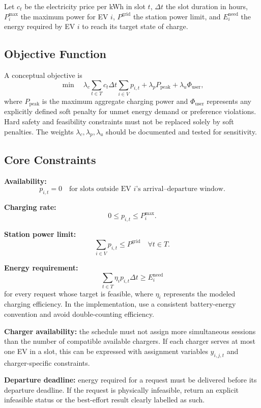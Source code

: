 \documentclass[11pt,a4paper]{article}
\begin{document}
Let \(c_t\) be the electricity price per kWh in slot \(t\), \(\Delta t\) the slot duration in hours, \(P_i^{\max}\) the maximum power for EV \(i\), \(P^{\mathrm{grid}}\) the station power limit, and \(E_i^{\mathrm{need}}\) the energy required by EV \(i\) to reach its target state of charge.

\subsection{Objective Function}

A conceptual objective is
\[
\min \quad
\lambda_c \sum_{t\in T} c_t \Delta t \sum_{i\in V} p_{i,t}
+ \lambda_p P_{\mathrm{peak}}
+ \lambda_u \Phi_{\mathrm{user}},
\]
where \(P_{\mathrm{peak}}\) is the maximum aggregate charging power and \(\Phi_{\mathrm{user}}\) represents any explicitly defined soft penalty for unmet energy demand or preference violations. Hard safety and feasibility constraints must not be replaced solely by soft penalties. The weights \(\lambda_c,\lambda_p,\lambda_u\) should be documented and tested for sensitivity.

\subsection{Core Constraints}

\textbf{Availability:}
\[
p_{i,t}=0 \quad \text{for slots outside EV } i\text{'s arrival--departure window.}
\]

\textbf{Charging rate:}
\[
0 \leq p_{i,t} \leq P_i^{\max}.
\]

\textbf{Station power limit:}
\[
\sum_{i\in V} p_{i,t} \leq P^{\mathrm{grid}}
\quad \forall t\in T.
\]

\textbf{Energy requirement:}
\[
\sum_{t\in T} \eta_i p_{i,t}\Delta t
\geq E_i^{\mathrm{need}}
\]
for every request whose target is feasible, where \(\eta_i\) represents the modeled charging efficiency. In the implementation, use a consistent battery-energy convention and avoid double-counting efficiency.

\textbf{Charger availability:} the schedule must not assign more simultaneous sessions than the number of compatible available chargers. If each charger serves at most one EV in a slot, this can be expressed with assignment variables \(y_{i,j,t}\) and charger-specific constraints.

\textbf{Departure deadline:} energy required for a request must be delivered before its departure deadline. If the request is physically infeasible, return an explicit infeasible status or the best-effort result clearly labelled as such.
\end{document}
